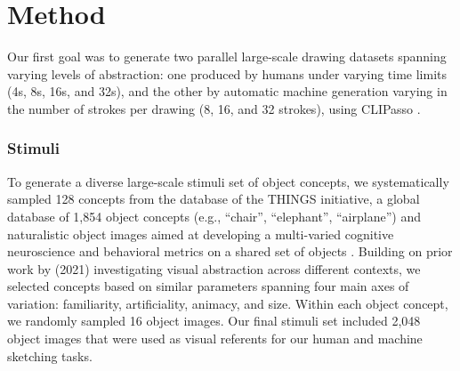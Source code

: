 \documentclass[10pt,letterpaper]{article}
\begin{document}
\section{Method}
Our first goal was to generate two parallel large-scale drawing datasets spanning varying levels of abstraction: one produced by humans under varying time limits (4s, 8s, 16s, and 32s), and the other by automatic machine generation varying in the number of strokes per drawing (8, 16, and 32 strokes), using CLIPasso \cite{vinker2022clipasso}.  



\subsubsection{Stimuli}
To generate a diverse large-scale stimuli set of object concepts, we systematically sampled 128 concepts from the database of the THINGS initiative, a global database of 1,854 object concepts (e.g., ``chair'', ``elephant'', ``airplane'') and naturalistic object images aimed at developing a multi-varied cognitive neuroscience and behavioral metrics on a shared set of objects \cite{hebart2019things}. 
Building on prior work by \citeauthor{yang2021visual} (2021) investigating visual abstraction across different contexts, we selected concepts based on similar parameters spanning four main axes of variation: familiarity, artificiality, animacy, and size. 
Within each object concept, we randomly sampled 16 object images. 
Our final stimuli set included 2,048 object images that were used as visual referents for our human and machine sketching tasks.
\end{document}
